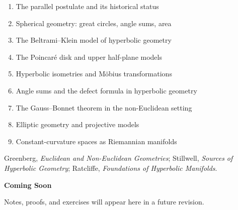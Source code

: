 \begin{enumerate}
  \item The parallel postulate and its historical status
  \item Spherical geometry: great circles, angle sums, area
  \item The Beltrami--Klein model of hyperbolic geometry
  \item The Poincar\'e disk and upper half-plane models
  \item Hyperbolic isometries and M\"obius transformations
  \item Angle sums and the defect formula in hyperbolic geometry
  \item The Gauss--Bonnet theorem in the non-Euclidean setting
  \item Elliptic geometry and projective models
  \item Constant-curvature spaces as Riemannian manifolds
\end{enumerate}

\begin{remark*}
Greenberg, \textit{Euclidean and Non-Euclidean Geometries};
Stillwell, \textit{Sources of Hyperbolic Geometry};
Ratcliffe, \textit{Foundations of Hyperbolic Manifolds}.
\end{remark*}

\vspace{1em}
\begin{tcolorbox}[
  colback=gray!6, colframe=gray!40, arc=2pt,
  left=8pt, right=8pt, top=6pt, bottom=6pt,
  title={\small\textbf{Status: Planned}},
  fonttitle=\small\bfseries
]
\begin{center}\Large\bfseries Coming Soon\end{center}
\vspace{6pt}
\noindent Notes, proofs, and exercises will appear here in a future revision.
\end{tcolorbox}

% 
% 
% 
% 
% 
% 
% 
